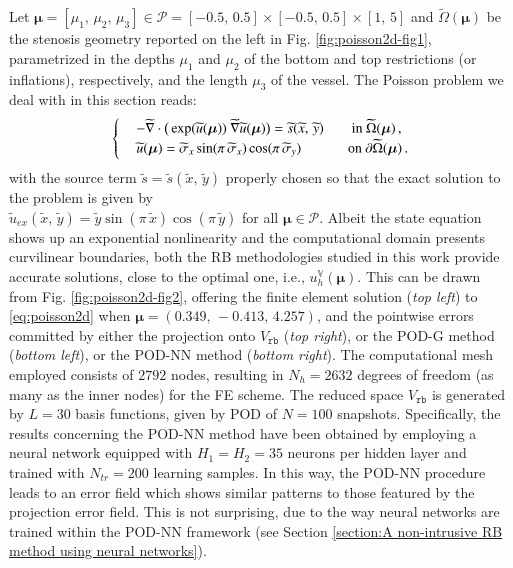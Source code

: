 \documentclass{elsarticle}
\numberwithin{equation}{section}
\theoremstyle{theorem}
\theoremstyle{definition}
\theoremstyle{remark}
\theoremstyle{proposition}
\numberwithin{figure}{section}
\newcommand{\wt}[1]{\widetilde{#1}}
\newcommand{\bg}[1]{\boldsymbol{#1}}
\begin{document}
		Let $\bg{\mu} = [\mu_1, \, \mu_2, \, \mu_3] \in \mathcal{P} = [-0.5, \, 0.5] \times [-0.5, \, 0.5] \times [1, \, 5]$ and $\wt{\Omega}(\bg{\mu})$ be the stenosis geometry reported on the left in Fig. \ref{fig:poisson2d-fig1}, parametrized in the depths $\mu_1$ and $\mu_2$ of the bottom and top restrictions (or inflations), respectively, and the length $\mu_3$ of the vessel. The Poisson problem we deal with in this section reads:
		\begin{equation}
			\label{eq:poisson2d}
			\begin{cases}
				& - \wt{\nabla} \cdot \big( \exp(\wt{u}(\bg{\mu})) ~ \wt{\nabla} \wt{u}(\bg{\mu}) \big) = \wt{s}(\wt{x}, \, \wt{y}) \hspace*{20pt} \text{in $\wt{\Omega}(\bg{\mu})$} \, , \\
				& \wt{u}(\bg{\mu}) = \wt{\sigma}_x \sin(\pi \, \wt{\sigma}_x) \cos(\pi \, \wt{\sigma}_y) \hspace*{33.5pt} \text{on $\partial \wt{\Omega}(\bg{\mu})$} \, .
			\end{cases}
		\end{equation}
		with the source term $\wt{s} = \wt{s}(\wt{x}, \, \wt{y})$ properly chosen so that the exact solution to the problem is given by \\ $\wt{u}_{ex}(\wt{x}, \, \wt{y}) = \wt{y} \sin(\pi \, \wt{x}) \cos(\pi \, \wt{y})$ for all $\bg{\mu} \in \mathcal{P}$. Albeit the state equation shows up an exponential nonlinearity and the computational domain presents curvilinear boundaries, both the RB methodologies studied in this work provide accurate solutions, close to the optimal one, i.e., $u_h^{\mathbb{V}}(\bg{\mu})$. %
		This can be drawn from Fig. \ref{fig:poisson2d-fig2}, offering the finite element solution (\emph{top left}) to \eqref{eq:poisson2d} when $\bg{\mu} = (0.349, \, -0.413, \, 4.257)$, and the pointwise errors committed by either the projection onto $V_{\texttt{rb}}$ (\emph{top right}), or the POD-G method (\emph{bottom left}), or the POD-NN method (\emph{bottom right}). The computational mesh employed consists of $2792$ nodes, resulting in $N_h = 2632$ degrees of freedom (as many as the inner nodes) for the FE scheme. The reduced space $V_{\texttt{rb}}$ is generated by $L = 30$ basis functions, given by POD of $N = 100$ snapshots. Specifically, the results concerning the POD-NN method have been obtained by employing a neural network equipped with $H_1 = H_2 = 35$ neurons per hidden layer and trained with $N_{tr} = 200$ learning samples. In this way, the POD-NN procedure leads to an error field which shows similar patterns to those featured by the projection error field. This is not surprising, due to the way neural networks are trained within the POD-NN framework (see Section \ref{section:A non-intrusive RB method using neural networks}). 
		
\end{document}
